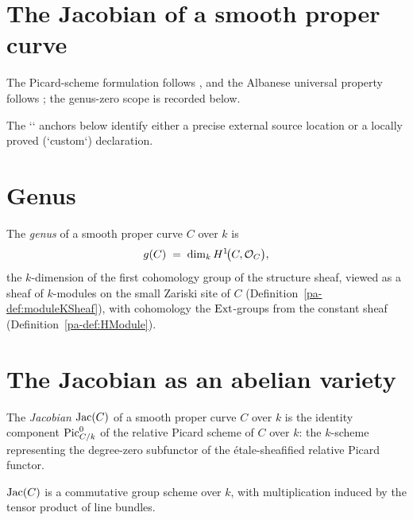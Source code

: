 \section{The Jacobian of a smooth proper curve}
\label{pa-chap:Challenge}


The Picard-scheme formulation follows \cite{kleiman-picard}, and the Albanese universal
property follows \cite{milne-av}; the genus-zero scope is recorded below.

The `\dcref` anchors below identify either a precise external source location or a locally
proved (`custom`) declaration.

\section{Genus}

\begin{definition}[Genus]
  \label{pa-def:genus}
  \leanok

  The \emph{genus} of a smooth proper curve \(C\) over \(k\) is
  \[
    g(C) \;=\; \dim_k H^1\!\bigl(C, \mathcal{O}_{C}\bigr),
  \]
  the \(k\)-dimension of the first cohomology group of the structure sheaf, viewed as a sheaf
  of \(k\)-modules on the small Zariski site of \(C\) (Definition~\ref{pa-def:moduleKSheaf}),
  with cohomology the \(\operatorname{Ext}\)-groups from the constant sheaf
  (Definition~\ref{pa-def:HModule}).
\end{definition}

\section{The Jacobian as an abelian variety}

\begin{definition}[Jacobian]
 \label{pa-def:jacobian}

  The \emph{Jacobian} \(\mathrm{Jac}(C)\) of a smooth proper curve \(C\) over \(k\) is the identity
  component \(\operatorname{Pic}^0_{C/k}\) of the relative Picard scheme of \(C\) over \(k\): the \(k\)-scheme
  representing the degree-zero subfunctor of the \'etale-sheafified relative Picard functor.
\end{definition}

\begin{proposition}
  \label{pa-prop:jacobian_grpobj}

  \(\mathrm{Jac}(C)\) is a commutative group scheme over \(k\), with multiplication induced by the tensor
  product of line bundles.
\end{proposition}

